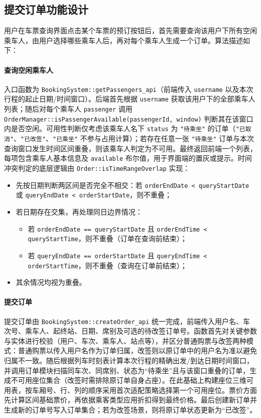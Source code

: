 \documentclass{article}
\begin{document}
	\subsection{提交订单功能设计}
	用户在车票查询界面点击某个车票的预订按钮后，首先需要查询该用户下所有空闲乘车人，由用户选择哪些乘车人后，再对每个乘车人生成一个订单。算法描述如下：
	
	\paragraph{查询空闲乘车人} 入口函数为 \texttt{BookingSystem::getPassengers\_api}（前端传入 \texttt{username} 以及本次行程的起止日期/时间窗口）。后端首先根据 \texttt{username} 获取该用户下的全部乘车人列表；随后对每个乘车人 \texttt{passenger} 调用 \texttt{OrderManager::isPassengerAvailable(passengerId, window)} 判断其在该窗口内是否空闲。可用性判断仅考虑该乘车人名下 \texttt{status} 为 \texttt{"待乘坐"} 的订单（\texttt{"已取消"}、\texttt{"已改签"}、\texttt{"已乘坐"} 不参与占用计算）；若存在任意一张 \texttt{"待乘坐"} 订单与本次查询窗口发生时间区间重叠，则该乘车人判定为不可用。最终返回前端一个列表，每项包含乘车人基本信息及 \texttt{available} 布尔值，用于界面端的置灰或提示。时间冲突判定的底层逻辑由 \texttt{Order::isTimeRangeOverlap} 实现：
	\begin{itemize}
		\item 先按日期判断两区间是否完全不相交：若 \texttt{orderEndDate < queryStartDate} 或 \texttt{queryEndDate < orderStartDate}，则不重叠；
		\item 若日期存在交集，再处理同日边界情况：
		\begin{itemize}
			\item 若 \texttt{orderEndDate == queryStartDate} 且 \texttt{orderEndTime < queryStartTime}，则不重叠（订单在查询前结束）；
			\item 若 \texttt{queryEndDate == orderStartDate} 且 \texttt{queryEndTime < orderStartTime}，则不重叠（查询在订单前结束）；
		\end{itemize}
		\item 其余情况均视为重叠。
	\end{itemize}
	
	\paragraph{提交订单} 提交订单由 \texttt{BookingSystem::createOrder\_api} 统一完成，前端传入用户名、车次号、乘车人、起终站、日期、席别及可选的待改签订单号。函数首先对关键参数与实体进行校验（用户、车次、乘车人、站点等），并区分普通购票与改签两种模式：普通购票以传入用户名作为订单归属，改签则以原订单中的用户名为准以避免归属不一致。随后根据列车时刻表计算本次行程的精确出发/到达日期时间窗口，并调用订单模块扫描同车次、同席别、状态为“待乘坐”且与该窗口重叠的订单，生成不可用座位集合（改签时需排除原订单自身占座）。在此基础上构建座位三维可用表，按车厢号、行、列的顺序采用首次适配策略选择第一个可用座位。票价方面先计算区间基础票价，再依据乘客类型应用折扣得到最终价格。最后创建新订单并生成新的订单号写入订单集合；若为改签场景，则将原订单状态更新为“已改签”。
	\newline
	
\end{document}

